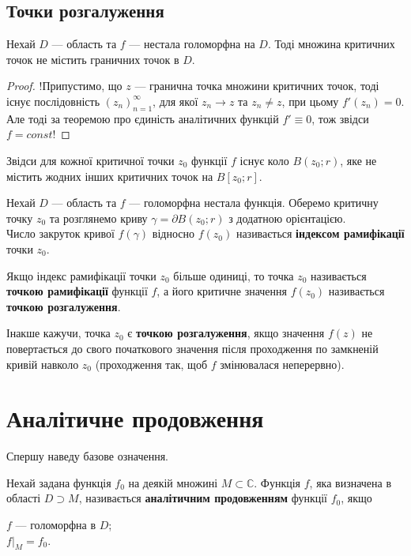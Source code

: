 \documentclass{math_library}
\begin{document}
\subsection{Точки розгалуження}
\begin{lemma}
Нехай $D$ --- область та $f$ --- нестала голоморфна на $D$. Тоді множина критичних точок не містить граничних точок в $D$.
\end{lemma}

\begin{proof}
!Припустимо, що $z$ --- гранична точка множини критичних точок, тоді існує послідовність $(z_n)_{n=1}^\infty$, для якої $z_n \to z$ та $z_n \neq z$, при цьому $f'(z_n) = 0$. Але тоді за теоремою про єдиність аналітичних функцій $f' \equiv 0$, тож звідси $f = const$! 
\end{proof}

Звідси для кожної критичної точки $z_0$ функції $f$ існує коло $B(z_0;r)$, яке не містить жодних інших критичних точок на $B[z_0;r]$.

\begin{definition}
Нехай $D$ --- область та $f$ --- голоморфна нестала функція. Оберемо критичну точку $z_0$ та розглянемо криву $\gamma = \partial B(z_0;r)$ з додатною орієнтацією.\\
Число закруток кривої $f(\gamma)$ відносно $f(z_0)$ називається \textbf{індексом рамифікації} точки $z_0$.
\end{definition}

\begin{definition}
Якщо індекс рамифікації точки $z_0$ більше одиниці, то точка $z_0$ називається \textbf{точкою рамифікації} функції $f$, а його критичне значення $f(z_0)$ називається \textbf{точкою розгалуження}.
\end{definition}

Інакше кажучи, точка $z_0$ є \textbf{точкою розгалуження}, якщо значення $f(z)$ не повертається до свого початкового значення після проходження по замкненій кривій навколо $z_0$ (проходження так, щоб $f$ змінювалася неперервно).
\newpage

\section{Аналітичне продовження}
Спершу наведу базове означення.

\begin{definition}
Нехай задана функція $f_0$ на деякій множині $M \subset \mathbb{C}$. Функція $f$, яка визначена в області $D \supset M$, називається \textbf{аналітичним продовженням} функції $f_0$, якщо
\begin{center}
$f$ --- голоморфна в $D$; \\
$f|_{M} = f_0$.
\end{center}
\end{definition}
\end{document}
